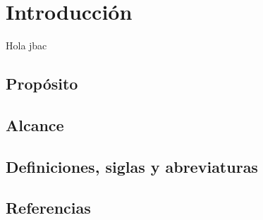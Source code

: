 \chapter{Introducción}
  Hola jbac
\section{Propósito}

\section{Alcance}

\section{Definiciones, siglas y abreviaturas}

\section{Referencias}